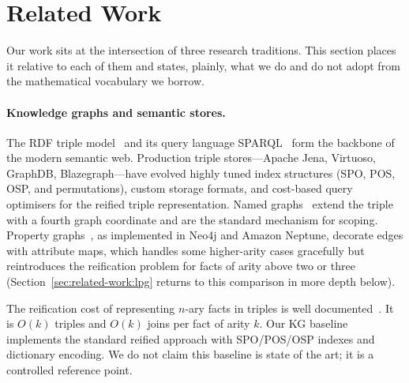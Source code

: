 \section{Related Work}
\label{sec:related-work}

Our work sits at the intersection of three research traditions. This section
places it relative to each of them and states, plainly, what we do and do not
adopt from the mathematical vocabulary we borrow.

\paragraph{Knowledge graphs and semantic stores.}
The RDF triple model~\cite{manola2004rdf} and its query language
SPARQL~\cite{sparql2013} form the backbone of the modern semantic web. Production
triple stores---Apache Jena, Virtuoso, GraphDB, Blazegraph---have evolved highly
tuned index structures (SPO, POS, OSP, and permutations), custom storage
formats, and cost-based query optimisers for the reified triple representation.
Named graphs~\cite{carroll2005named} extend the triple with a fourth graph
coordinate and are the standard mechanism for scoping. Property
graphs~\cite{angles2017property}, as implemented in Neo4j and Amazon Neptune,
decorate edges with attribute maps, which handles some higher-arity cases
gracefully but reintroduces the reification problem for facts of arity above
two or three (Section~\ref{sec:related-work:lpg} returns to this comparison
in more depth below).

The reification cost of representing $n$-ary facts in triples is well
documented~\cite{angles2008survey,noy2006nary}. It is $O(k)$ triples and
$O(k)$ joins per fact of arity $k$. Our KG baseline implements the standard
reified approach with SPO/POS/OSP indexes and dictionary encoding. We do
not claim this baseline is state of the art; it is a controlled reference
point.

